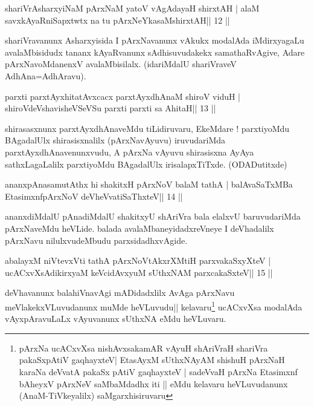 \begin{shl}
shariVrAsharxyiNaM pArxNaM yatoV vAgAdayaH shirxtAH |
alaM savxkAyaRniSapxtwtx na tu pArxNeYkasaMshirxtAH\hfill || 12 ||
\end{shl}

\begin{artha}
shariVravanunx Asharxyisida I pArxNavanunx vAkukx modalAda iMdirxyagaLu avalaMbisidudx tananx kAyaRvanunx sAdhisuvudakekx samathaRvAgive, Adare pArxNavoMdanenxV avalaMbisilalx. (idariMdalU shariVraveV AdhAna=AdhAravu).
\end{artha}



\begin{shl}
parxti parxtAyxhitatAvxcacx parxtAyxdhAnaM shiroV viduH |
shiroVdeVshavisheVSeVSu parxti parxti sa AhitaH\hfill || 13 ||
\end{shl}

\begin{artha}
shirasasxnunx parxtAyxdhAnaveMdu tiLidiruvaru, EkeMdare ! parxtiyoMdu
BAgadalUlx shirasisxnalilx (pArxNavAyuvu) iruvudariMda
parxtAyxdhAnavenunxvudu, A pArxNa vAyuvu shirasisxna AyAya
sathxLagaLalilx parxtiyoMdu BAgadalUlx irisalapxTiTxde. (ODADutitxde)
\end{artha}



\begin{shl}
ananxpAnasamutAthx hi shakitxH pArxNoV balaM tathA |
balAvaSaTxMBa EtasimxnfpArxNoV deVheV\s vatiSaThxteV\hfill || 14 ||
\end{shl}

\begin{artha}
ananxdiMdalU pAnadiMdalU shakitxyU shAriVra bala elalxvU baruvudariMda pArxNaveMdu heVLide. balada avalaMbaneyidadxreVneye I deVhadalilx pArxNavu nilulxvudeMbudu parxsidadhxvAgide.
\end{artha}



\begin{shl}
abalayxM niVtevxVti tathA pArxNoVtAkxrXMtiH parxvakaSxyXteV |
ucACxvXsAdikirxyaM keVcidAvxyuM sUthxNAM parxcakaSxteV\hfill || 15 ||
\end{shl}

\begin{artha}
deVhavanunx balahiVnavAgi mADidadxlilx AvAga pArxNavu
meVlakekxVLuvudanunx muMde heVLuvudu|| kelavaru\footnote{pArxNa
  ucACxvXsa nishAvxsakamAR vAyuH shAriVraH shariVra pakaSxpAtiV
  gaqhayxteV| EtasAyxM sUthxNAyAM shishuH pArxNaH karaNa deVvatA
  pakaSx pAtiV gaqhayxteV | sadeVvaH pArxNa Etasimxnf bAheyxV pArxNeV
  saMbaMdadhx iti || eMdu kelavaru heVLuvudanunx (AnaM-TiVkeyalilx) saMgarxhisiruvaru} ucACxvXsa modalAda
vAyxpAravuLaLx vAyuvanunx sUthxNA eMdu heVLuvaru.
\end{artha}

